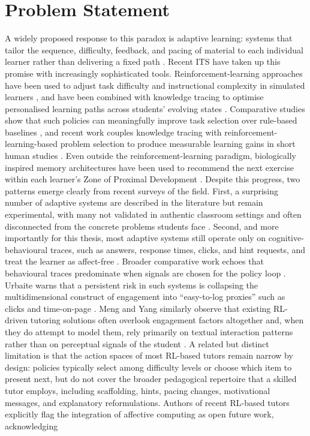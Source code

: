 \section{Problem Statement}\label{sec:problem}

A widely proposed response to this paradox is adaptive learning: systems that tailor the sequence, difficulty, feedback, and pacing of material to each individual learner rather than delivering a fixed path \cite{gligorea_adaptive_2023,strielkowski_span_2025}. Recent \ac{ITS} have taken up this promise with increasingly sophisticated tools. Reinforcement-learning approaches have been used to adjust task difficulty and instructional complexity in simulated learners \cite{axak_adaptive_2025,deshmukh_developing_2025}, and have been combined with knowledge tracing to optimise personalised learning paths across students' evolving states \cite{fu_integrating_2025}. Comparative studies show that such policies can meaningfully improve task selection over rule-based baselines \cite{azoulay_adaptive_2021}, and recent work couples knowledge tracing with reinforcement-learning-based problem selection to produce measurable learning gains in short human studies \cite{guzman_developing_2025}. Even outside the reinforcement-learning paradigm, biologically inspired memory architectures have been used to recommend the next exercise within each learner's Zone of Proximal Development \cite{kuling_ken_2025}. Despite this progress, two patterns emerge clearly from recent surveys of the field. First, a surprising number of adaptive systems are described in the literature but remain experimental, with many not validated in authentic classroom settings and often disconnected from the concrete problems students face \cite{kabudi_ai-enabled_2021,zerkouk_comprehensive_2025}. Second, and more importantly for this thesis, most adaptive systems still operate only on cognitive-behavioural traces, such as answers, response times, clicks, and hint requests, and treat the learner as affect-free \cite{axak_adaptive_2025,fu_integrating_2025,azoulay_adaptive_2021}. Broader comparative work echoes that behavioural traces predominate when signals are chosen for the policy loop \cite{guzman_developing_2025,weitekamp_tutorgym_2025}. Urbaite warns that a persistent risk in such systems is collapsing the multidimensional construct of engagement into ``easy-to-log proxies'' such as clicks and time-on-page \cite{urbaite_adaptive_2026}. Meng and Yang similarly observe that existing \ac{RL}-driven tutoring solutions often overlook engagement factors altogether and, when they do attempt to model them, rely primarily on textual interaction patterns rather than on perceptual signals of the student \cite{meng_self-evolving_2025}. A related but distinct limitation is that the action spaces of most \ac{RL}-based tutors remain narrow by design: policies typically select among difficulty levels or choose which item to present next, but do not cover the broader pedagogical repertoire that a skilled tutor employs, including scaffolding, hints, pacing changes, motivational messages, and explanatory reformulations. Authors of recent \ac{RL}-based tutors explicitly flag the integration of affective computing as open future work, acknowledging 